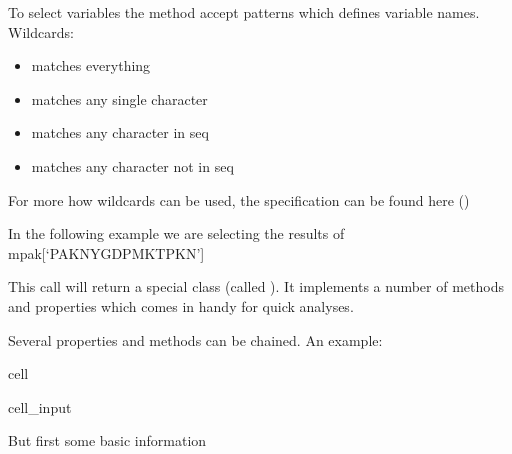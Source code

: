 \documentclass[letterpaper,10pt,english]{jupyterBook}
\begin{document}
\sphinxAtStartPar
To select variables the method accept patterns which defines variable names. Wildcards:
\begin{itemize}
\item {} 
\sphinxAtStartPar
\sphinxcode{\sphinxupquote{\textbackslash{}*}} matches everything

\item {} 
\sphinxAtStartPar
{} matches any single character

\item {} 
\sphinxAtStartPar
\sphinxcode{\sphinxupquote{\textbackslash{}{[}seq{]}}} matches any character in seq

\item {} 
\sphinxAtStartPar
\sphinxcode{\sphinxupquote{\textbackslash{}{[}!seq{]}}} matches any character not in seq

\end{itemize}

\sphinxAtStartPar
For more how wildcards can be used, the specification can be found here ()

\sphinxAtStartPar
In the following example we are selecting the results of mpak{[}‘PAKNYGDPMKTPKN’{]}

\sphinxAtStartPar
This call will return a special class (called ). It implements a number
of methods and properties which comes in handy for quick analyses.

\sphinxAtStartPar
Several properties and methods can be chained. An example:

\begin{sphinxuseclass}{cell}\begin{sphinxVerbatimInput}

\begin{sphinxuseclass}{cell_input}
\begin{sphinxVerbatim}[commandchars=\\\{\}]
 
    \PYG{p}{[}\PYG{p}{]}
\end{sphinxVerbatim}

\end{sphinxuseclass}\end{sphinxVerbatimInput}

\end{sphinxuseclass}
\sphinxAtStartPar
But first some basic information
\end{document}
